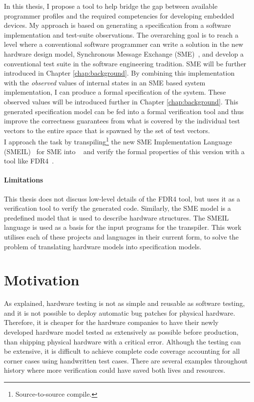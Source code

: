 In this thesis, I propose a tool to help bridge the gap between available programmer profiles and the required competencies for developing embedded devices. My approach is based on generating a specification from a software implementation and test-suite observations. The overarching goal is to reach a level where a conventional software programmer can write a solution in the new hardware design model, Synchronous Message Exchange (SME)~\cite{Vinter2014, Vinter2015, Skovhede}, and develop a conventional test suite in the software engineering tradition. SME will be further introduced in Chapter \ref{chap:background}. By combining this implementation with the \emph{observed} values of internal states in an SME based system implementation, I can produce a formal specification of the system. These observed values will be introduced further in Chapter \ref{chap:background}.
This generated specification model can be fed into a formal verification tool and thus improve the correctness guarantees from what is covered by the individual test vectors to the entire space that is spawned by the set of test vectors.\\

I approach the task by transpiling\footnote{Source-to-source compile.} the new SME Implementation Language (SMEIL)~\cite{smeil} for SME into \cspm{}~\cite{Scattergood1998} and verify the formal properties of this version with a tool like FDR4~\cite{fdr}.
\paragraph{Limitations}
This thesis does not discuss low-level details of the FDR4 tool, but uses it as a verification tool to verify the generated \cspm{} code.
Similarly, the SME model is a predefined model that is used to describe hardware structures.
The SMEIL language is used as a basis for the input programs for the transpiler.
This work utilises each of these projects and languages in their current form, to solve the problem of translating hardware models into specification models.
\section{Motivation}
As explained, hardware testing is not as simple and reusable as software testing, and it is not possible to deploy automatic bug patches for physical hardware. Therefore, it is cheaper for the hardware companies to have their newly developed hardware model tested as extensively as possible before production, than shipping physical hardware with a critical error. Although the testing can be extensive, it is difficult to achieve complete code coverage accounting for all corner cases using handwritten test cases. There are several examples throughout history where more verification could have saved both lives and resources.
